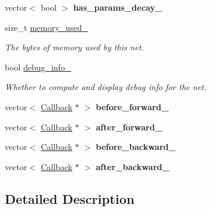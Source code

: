 \begin{DoxyCompactItemize}
\mbox{\label{classcaffe_1_1_net_a49badecd06c709d5240e9893f8734873}} 
vector$<$ bool $>$ {\bfseries has\+\_\+params\+\_\+decay\+\_\+}
\item 
\mbox{\label{classcaffe_1_1_net_a84349f399faa4246f8395e63c9334d56}} 
size\+\_\+t \mbox{\hyperlink{classcaffe_1_1_net_a84349f399faa4246f8395e63c9334d56}{memory\+\_\+used\+\_\+}}
\begin{DoxyCompactList}\small\item\em The bytes of memory used by this net. \end{DoxyCompactList}\item 
\mbox{\label{classcaffe_1_1_net_addc4e5501070ede24155d4c1bf9928a2}} 
bool \mbox{\hyperlink{classcaffe_1_1_net_addc4e5501070ede24155d4c1bf9928a2}{debug\+\_\+info\+\_\+}}
\begin{DoxyCompactList}\small\item\em Whether to compute and display debug info for the net. \end{DoxyCompactList}\item 
\mbox{\label{classcaffe_1_1_net_aedcffae6c61ee788a21215d5f131131c}} 
vector$<$ \mbox{\hyperlink{classcaffe_1_1_net_1_1_callback}{Callback}} $\ast$ $>$ {\bfseries before\+\_\+forward\+\_\+}
\item 
\mbox{\label{classcaffe_1_1_net_a5ca2ef3cd0b6c2923e6ab653fc87f7d5}} 
vector$<$ \mbox{\hyperlink{classcaffe_1_1_net_1_1_callback}{Callback}} $\ast$ $>$ {\bfseries after\+\_\+forward\+\_\+}
\item 
\mbox{\label{classcaffe_1_1_net_a1338ad46167974dbdc7333ca40615d09}} 
vector$<$ \mbox{\hyperlink{classcaffe_1_1_net_1_1_callback}{Callback}} $\ast$ $>$ {\bfseries before\+\_\+backward\+\_\+}
\item 
\mbox{\label{classcaffe_1_1_net_ad98628cfcbf90ed9093b42b61ba19ec8}} 
vector$<$ \mbox{\hyperlink{classcaffe_1_1_net_1_1_callback}{Callback}} $\ast$ $>$ {\bfseries after\+\_\+backward\+\_\+}
\end{DoxyCompactItemize}


\subsection{Detailed Description}
